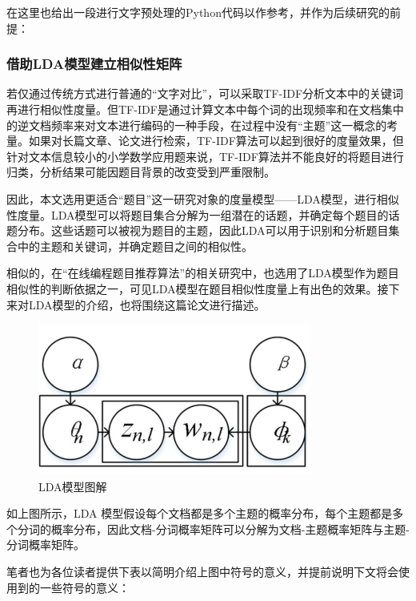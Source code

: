 在这里也给出一段进行文字预处理的Python代码以作参考，并作为后续研究的前提：

\begin{mgCodeBlock}
\end{mgCodeBlock}

\subsubsection{借助LDA模型建立相似性矩阵}

若仅通过传统方式进行普通的“文字对比”，可以采取TF-IDF分析文本中的关键词再进行相似性度量。但TF-IDF是通过计算文本中每个词的出现频率和在文档集中的逆文档频率来对文本进行编码的一种手段，在过程中没有“主题”这一概念的考量。如果对长篇文章、论文进行检索，TF-IDF算法可以起到很好的度量效果，但针对文本信息较小的小学数学应用题来说，TF-IDF算法并不能良好的将题目进行归类，分析结果可能因题目背景的改变受到严重限制。

因此，本文选用更适合“题目”这一研究对象的度量模型——LDA模型，进行相似性度量。LDA模型可以将题目集合分解为一组潜在的话题，并确定每个题目的话题分布。这些话题可以被视为题目的主题，因此LDA可以用于识别和分析题目集合中的主题和关键词，并确定题目之间的相似性。

相似的，在“在线编程题目推荐算法”的相关研究中\cite{LuoRongHeZhiShiDianYuTuJuanJiDeZaiXianBianChengTiMuTuiJianSuanFa}，也选用了LDA模型作为题目相似性的判断依据之一，可见LDA模型在题目相似性度量上有出色的效果。接下来对LDA模型的介绍，也将围绕这篇论文进行描述。

\begin{figure}[htbp]
    \centering
    \includegraphics[width=9cm,height=5cm]{res/LDA.jpg}
    \caption{LDA模型图解}
\end{figure} 

如上图所示，LDA 模型假设每个文档都是多个主题的概率分布，每个主题都是多个分词的概率分布，因此文档-分词概率矩阵可以分解为文档-主题概率矩阵与主题-分词概率矩阵。

笔者也为各位读者提供下表以简明介绍上图中符号的意义，并提前说明下文将会使用到的一些符号的意义：

